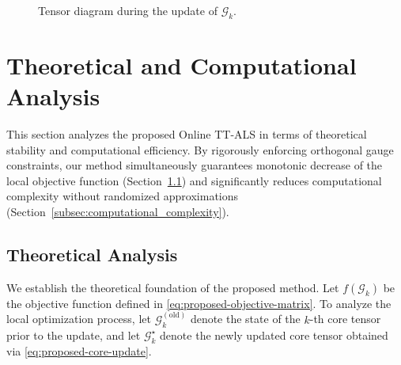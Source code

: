 \documentclass[a4paper, 11pt]{article}
\theoremstyle{plain}
\theoremstyle{definition}
\theoremstyle{remark}
\begin{document}
\begin{figure}[t]
  \centering
  \caption{Tensor diagram during the update of $\mathcal{G}_k$.}
  \label{fig:tensor-diagram-updating}
\end{figure}

\section{Theoretical and Computational Analysis}
\label{sec:theoretical_and_computational_analysis}
This section analyzes the proposed Online TT-ALS in terms of theoretical stability and computational efficiency.
By rigorously enforcing orthogonal gauge constraints, our method simultaneously guarantees monotonic decrease of the local objective function (Section~\ref{subsec:theoretical_analysis}) and significantly reduces computational complexity without randomized approximations (Section~\ref{subsec:computational_complexity}).

\subsection{Theoretical Analysis}
\label{subsec:theoretical_analysis}
We establish the theoretical foundation of the proposed method.
Let $f(\mathcal{G}_k)$ be the objective function defined in \eqref{eq:proposed-objective-matrix}.
To analyze the local optimization process, let $\mathcal{G}_k^{(\text{old})}$ denote the state of the $k$-th core tensor prior to the update, and let $\mathcal{G}_k^\star$ denote the newly updated core tensor obtained via \eqref{eq:proposed-core-update}.
\end{document}
